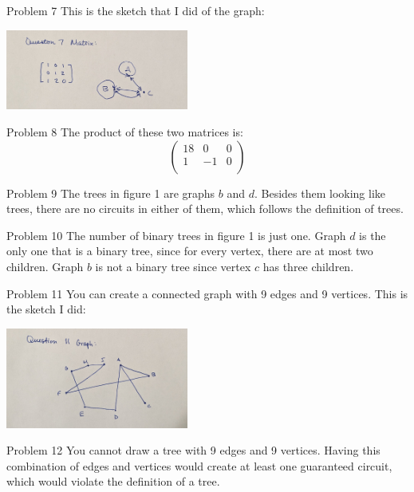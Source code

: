 \documentclass[12pt]{article}
\begin{document}
  \begin{problem}{Problem 7}
    This is the sketch that I did of the graph:
    \begin{center}
      \includegraphics[width=6cm]{./Question7.jpg}
    \end{center}
  \end{problem}

  \begin{problem}{Problem 8}
    The product of these two matrices is:
    \begin{equation*}
      \begin{pmatrix}
        18 & 0 & 0 \\
        1 & -1 & 0 \\
      \end{pmatrix}
    \end{equation*}
  \end{problem}

  \begin{problem}{Problem 9}
    The trees in figure 1 are graphs $b$ and $d$. Besides them looking like trees, there are no circuits in either
    of them, which follows the definition of trees.
  \end{problem}

  \begin{problem}{Problem 10}
    The number of binary trees in figure 1 is just one. Graph $d$ is the only one that is a binary tree, since 
    for every vertex, there are at most two children. Graph $b$ is not a binary tree since vertex $c$ has three
    children.
  \end{problem}

  \begin{problem}{Problem 11}
    You can create a connected graph with 9 edges and 9 vertices. This is the sketch I did:
    \begin{center}
      \includegraphics[width=6cm]{./Question11.jpg}
    \end{center}
  \end{problem}

  \begin{problem}{Problem 12}
    You cannot draw a tree with 9 edges and 9 vertices. Having this combination of edges and vertices would create
    at least one guaranteed circuit, which would violate the definition of a tree.
  \end{problem}
\end{document}
